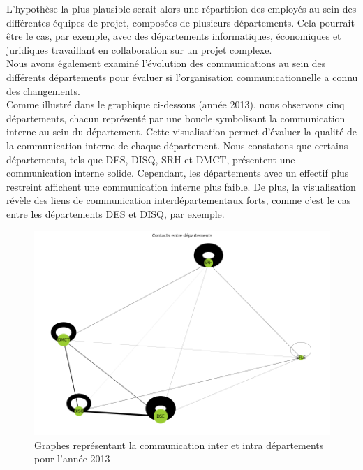 \documentclass{article}
\begin{document}
L'hypothèse la plus plausible serait alors une répartition des employés au sein des différentes équipes de projet, composées de plusieurs départements. Cela pourrait être le cas, par exemple, avec des départements informatiques, économiques et juridiques travaillant en collaboration sur un projet complexe. \\

Nous avons également examiné l'évolution des communications au sein des différents départements pour évaluer si l'organisation communicationnelle a connu des changements. \\

Comme illustré dans le graphique ci-dessous (année 2013), nous observons cinq départements, chacun représenté par une boucle symbolisant la communication interne au sein du département. Cette visualisation permet d'évaluer la qualité de la communication interne de chaque département. Nous constatons que certains départements, tels que DES, DISQ, SRH et DMCT, présentent une communication interne solide. Cependant, les départements avec un effectif plus restreint affichent une communication interne plus faible. De plus, la visualisation révèle des liens de communication interdépartementaux forts, comme c'est le cas entre les départements DES et DISQ, par exemple.

\begin{figure}[!h]
    \centering
    \includegraphics[width=15cm]{assets/communaute/communaute_communication_2013.png}
    \caption{Graphes représentant la communication inter et intra départements pour l'année 2013}
    \label{fig:communaute_communication_2013}
\end{figure}
\end{document}

